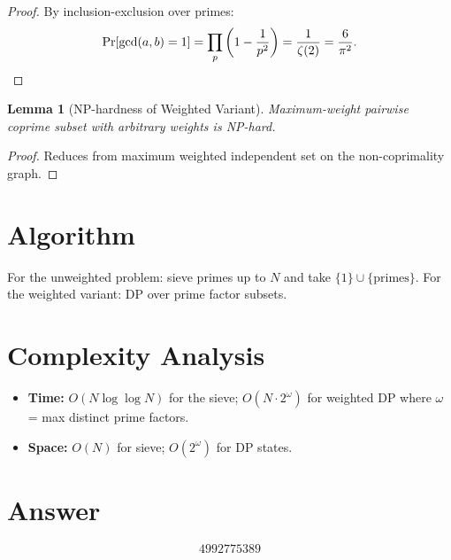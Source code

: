 \documentclass[11pt]{article}
\newtheorem{lemma}[theorem]{Lemma}
\begin{document}
\begin{proof}
By inclusion-exclusion over primes:
\[
\Pr[\gcd(a,b)=1] = \prod_{p} \left(1 - \frac{1}{p^2}\right) = \frac{1}{\zeta(2)} = \frac{6}{\pi^2}. \qedhere
\]
\end{proof}

\begin{lemma}[NP-hardness of Weighted Variant]
Maximum-weight pairwise coprime subset with arbitrary weights is NP-hard.
\end{lemma}

\begin{proof}
Reduces from maximum weighted independent set on the non-coprimality graph.
\end{proof}

\section{Algorithm}

For the unweighted problem: sieve primes up to $N$ and take $\{1\} \cup \{\text{primes}\}$. For the weighted variant: DP over prime factor subsets.

\section{Complexity Analysis}

\begin{itemize}
\item \textbf{Time:} $O(N \log\log N)$ for the sieve; $O(N \cdot 2^{\omega})$ for weighted DP where $\omega$ = max distinct prime factors.
\item \textbf{Space:} $O(N)$ for sieve; $O(2^{\omega})$ for DP states.
\end{itemize}

\section{Answer}

\[
\boxed{4992775389}
\]
\end{document}
